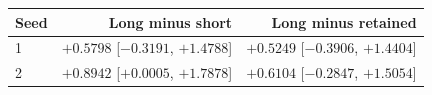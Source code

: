 \begin{tabular}{lrr}
\toprule
Seed & Long minus short & Long minus retained \\
\midrule
1 & $+0.5798$ [$-0.3191$, $+1.4788$] & $+0.5249$ [$-0.3906$, $+1.4404$] \\
2 & $+0.8942$ [$+0.0005$, $+1.7878$] & $+0.6104$ [$-0.2847$, $+1.5054$] \\
\bottomrule
\end{tabular}
